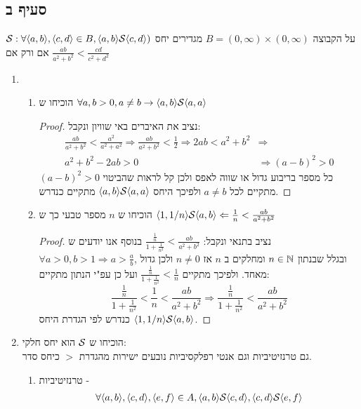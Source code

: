 \documentclass{article}
\begin{document}
\subsection*{סעיף ב}
על הקבוצה
$B = (0, \infty) \times (0, \infty)$ מגדירים יחס $\mathcal{S}: \forall \langle a, b \rangle, \langle c, d \rangle \in B, \langle a, b \rangle \mathcal{S} \langle c,d \rangle)$
אם ורק אם $\frac{ab}{a^2 + b^2} < \frac{cd}{c^2 + d^2}$
\begin{enumerate}
	\item \begin{enumerate}
		\item הוכיחו ש $\forall a,b > 0, a \neq b \to \langle a,b \rangle\mathcal{S}\langle a,a \rangle$
		\begin{proof}
			נציב את האיברים באי שוויון ונקבל:
			\begin{align*}
				\frac{ab}{a^2 + b^2} < \frac{a^2}{a^2 + a^2} \Rightarrow
				\frac{ab}{a^2 + b^2} < \frac{1}{2} \Rightarrow
				2ab < a^2 + b^2 &\Rightarrow \\
				a^2 + b^2 - 2ab > 0 &\Rightarrow
				(a-b)^2 > 0
			\end{align*}
			כל מספר בריבוע גדול או שווה לאפס ולכן קל לראות שהביטוי $(a-b)^2 > 0$ מתקיים לכל  $a \neq b$  ולפיכך היחס $\langle a,b \rangle \mathcal{S} \langle a,a \rangle$ מתקיים כנדרש.
		\end{proof}
		\item הוכיחו ש $n$ מספר טבעי כך ש $\langle 1, 1/n \rangle\mathcal{S}\langle a,b \rangle \Leftarrow \frac{1}{n} < \frac{ab}{a^2 + b^2}$
		\begin{proof}
			נציב בתנאי ונקבל: $\frac{\frac{1}{n}}{1 + \frac{1}{n^2}} < \frac{ab}{a^2 + b^2}$
			בנוסף אנו יודעים ש \\
			$\forall a > 0, b > 1 \Rightarrow a > \frac{a}{b}$, ובגלל שבנתון  $n \in \mathbb{N}$ ומחלקים ב $n$ אז $n \neq 0$ ולכן גדול מאחד.
			ולפיכך מתקיים $\frac{\frac{1}{n}}{1 + \frac{1}{n^2}} < \frac{1}{n}$ ועל כן עפ"י הנתון מתקיים:
			\[
				\frac{\frac{1}{n}}{1 + \frac{1}{n^2}} < \frac{1}{n} < \frac{ab}{a^2 + b^2} \Rightarrow
				\frac{\frac{1}{n}}{1 + \frac{1}{n^2}} < \frac{ab}{a^2 + b^2}
			\]
			כנדרש לפי הגדרת היחס $\langle 1, 1/n \rangle \mathcal{S} \langle a,b \rangle$.
		\end{proof}
	\end{enumerate}
	\item הוכיחו ש $\mathcal{S}$ הוא יחס חלקי: \\
	גם טרנזיטיביות וגם אנטי רפלקסיביות נובעים ישירות מהגדרת $>$ כיחס סדר.
	\begin{enumerate}
		\item טרנזיטיביות -
		\begin{align*}
			& \forall \ang{a, b}, \ang{c,d}, \ang{e,f} \in A, \ang{a,b}\SS\ang{c,d}, \ang{c,d}\SS\ang{e,f}  \\

\end{align*}
\end{enumerate}
\end{enumerate}
\end{document}
